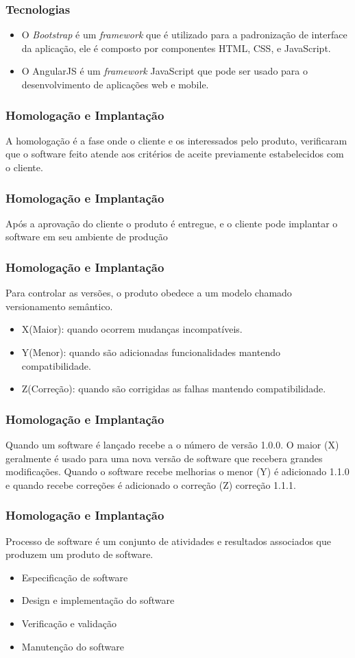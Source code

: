 \documentclass{beamer}
\begin{document}
	\begin{frame}\frametitle{Tecnologias}
		\begin{itemize}
			\item O \textit{Bootstrap} é um \textit{framework} que é utilizado para a padronização de interface da aplicação, ele é composto por componentes HTML, CSS, e JavaScript.
			\item O AngularJS é um \textit{framework} JavaScript que pode ser usado para o desenvolvimento de aplicações web e mobile.
		\end{itemize}
	\end{frame}

	\begin{frame}\frametitle{Homologação e Implantação}
		A homologação é a fase onde o cliente e os interessados pelo produto, verificaram que o software feito atende aos critérios de aceite previamente estabelecidos com o cliente.
	\end{frame}
	
	\begin{frame}\frametitle{Homologação e Implantação}
		Após a aprovação do cliente o produto é entregue, e o cliente pode implantar o software em seu ambiente de produção
	\end{frame}

	\begin{frame}\frametitle{Homologação e Implantação}
		Para controlar as versões, o produto obedece a um modelo chamado versionamento semântico.
		\begin{itemize}
			\item X(Maior): quando ocorrem mudanças incompatíveis.
			\item Y(Menor): quando são adicionadas funcionalidades mantendo compatibilidade.
			\item Z(Correção): quando são corrigidas as falhas mantendo compatibilidade.
		\end{itemize}
	\end{frame}

	\begin{frame}\frametitle{Homologação e Implantação}
		Quando um software é lançado recebe a o número de versão 1.0.0. O maior (X) geralmente é usado para uma nova versão de software que recebera grandes modificações.
		Quando o software recebe melhorias o menor (Y) é adicionado 1.1.0 e quando recebe correções é adicionado o correção (Z) correção 1.1.1.
	\end{frame}

	\begin{frame}\frametitle{Homologação e Implantação}
		Processo de software é um conjunto de atividades e resultados associados que produzem um produto de software.
		\begin{itemize}
			\item Especificação de software
			\item Design e implementação do software
			\item Verificação e validação
			\item Manutenção do software
		\end{itemize}
	\end{frame}
\end{document}
